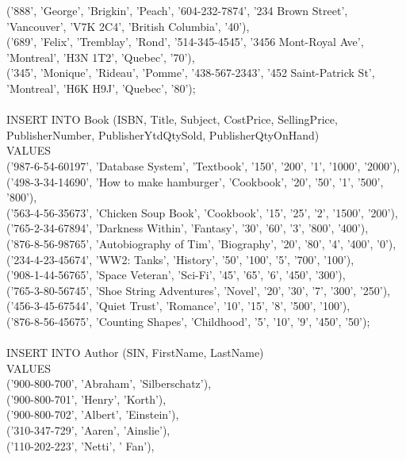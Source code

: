 \documentclass{scrreprt}
\begin{document}
       ('888', 'George', 'Brigkin', 'Peach', '604-232-7874', '234 Brown Street', 'Vancouver', 'V7K 2C4',
        'British Columbia', '40'),\\
       ('689', 'Felix', 'Tremblay', 'Rond', '514-345-4545', '3456 Mont-Royal Ave', 'Montreal', 'H3N 1T2', 'Quebec', '70'),\\
       ('345', 'Monique', 'Rideau', 'Pomme', '438-567-2343', '452 Saint-Patrick St', 'Montreal', 'H6K H9J', 'Quebec',
        '80');\\\\
INSERT INTO Book (ISBN, Title, Subject, CostPrice, SellingPrice, PublisherNumber, PublisherYtdQtySold,
                  PublisherQtyOnHand)\\
VALUES\\ ('987-6-54-60197', 'Database System', 'Textbook', '150', '200', '1', '1000', '2000'),
       ('498-3-34-14690', 'How to make hamburger', 'Cookbook', '20', '50', '1', '500', '800'),\\
       ('563-4-56-35673', 'Chicken Soup Book', 'Cookbook', '15', '25', '2', '1500', '200'),\\
       ('765-2-34-67894', 'Darkness Within', 'Fantasy', '30', '60', '3', '800', '400'),\\
       ('876-8-56-98765', 'Autobiography of Tim', 'Biography', '20', '80', '4', '400', '0'),\\
       ('234-4-23-45674', 'WW2: Tanks', 'History', '50', '100', '5', '700', '100'),\\
       ('908-1-44-56765', 'Space Veteran', 'Sci-Fi', '45', '65', '6', '450', '300'),\\
       ('765-3-80-56745', 'Shoe String Adventures', 'Novel', '20', '30', '7', '300', '250'),\\
       ('456-3-45-67544', 'Quiet Trust', 'Romance', '10', '15', '8', '500', '100'),\\
       ('876-8-56-45675', 'Counting Shapes', 'Childhood', '5', '10', '9', '450', '50');\\\\
INSERT INTO Author (SIN, FirstName, LastName)\\
VALUES\\ ('900-800-700', 'Abraham', 'Silberschatz'),\\
       ('900-800-701', 'Henry', 'Korth'),\\
       ('900-800-702', 'Albert', 'Einstein'),\\
       ('310-347-729', 'Aaren', 'Ainslie'),\\
       ('110-202-223', 'Netti', ' Fan'),\\
\end{document}
